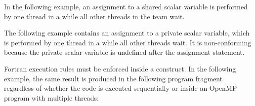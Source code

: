 In the following example, an assignment to a shared scalar variable is performed 
by one thread in a  while all other threads in the team wait.


The following example contains an assignment to a private scalar variable, which 
is performed by one thread in a  while all other threads wait. 
It is non-conforming because the private scalar variable is undefined after the 
assignment statement. 


Fortran execution rules must be enforced inside a  construct. 
In the following example, the same result is produced in the following program 
fragment regardless of whether the code is executed sequentially or inside an OpenMP 
program with multiple threads:

\fortranspecificend


